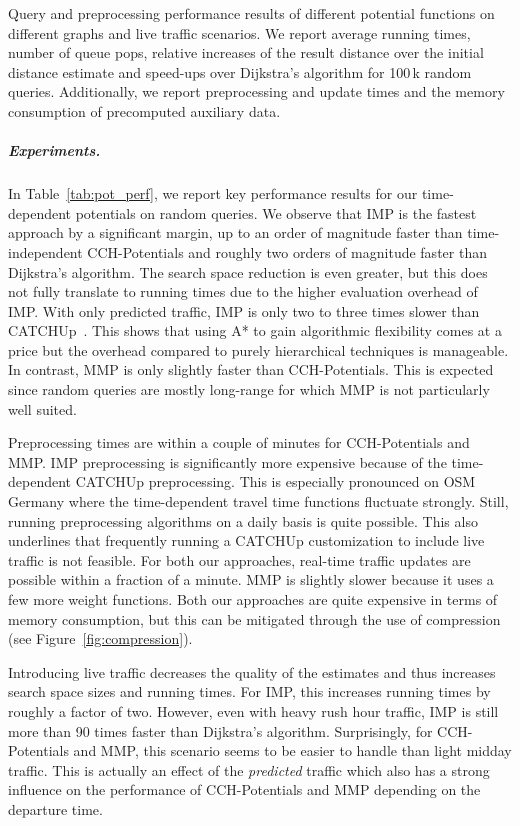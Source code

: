 \documentclass[a4paper,UKenglish,cleveref, autoref, thm-restate,anonymous]{lipics-v2021}
\begin{document}
\begin{table}
\centering
\caption{
Query and preprocessing performance results of different potential functions on different graphs and live traffic scenarios.
We report average running times, number of queue pops, relative increases of the result distance over the initial distance estimate and speed-ups over Dijkstra's algorithm for 100\,k random queries.
Additionally, we report preprocessing and update times and the memory consumption of precomputed auxiliary data.
}\label{tab:pot_perf}

\end{table}

\subparagraph{Experiments.} In Table~\ref{tab:pot_perf}, we report key performance results for our time-dependent potentials on random queries.
We observe that IMP is the fastest approach by a significant margin, up to an order of magnitude faster than time-independent CCH-Potentials and roughly two orders of magnitude faster than Dijkstra's algorithm.
The search space reduction is even greater, but this does not fully translate to running times due to the higher evaluation overhead of IMP.
With only predicted traffic, IMP is only two to three times slower than CATCHUp~\cite{swz-sfert-21}.
This shows that using A* to gain algorithmic flexibility comes at a price but the overhead compared to purely hierarchical techniques is manageable.
In contrast, MMP is only slightly faster than CCH-Potentials.
This is expected since random queries are mostly long-range for which MMP is not particularly well suited.

Preprocessing times are within a couple of minutes for CCH-Potentials and MMP.
IMP preprocessing is significantly more expensive because of the time-dependent CATCHUp preprocessing.
This is especially pronounced on OSM Germany where the time-dependent travel time functions fluctuate strongly.
Still, running preprocessing algorithms on a daily basis is quite possible.
This also underlines that frequently running a CATCHUp customization to include live traffic is not feasible.
For both our approaches, real-time traffic updates are possible within a fraction of a minute.
MMP is slightly slower because it uses a few more weight functions.
Both our approaches are quite expensive in terms of memory consumption, but this can be mitigated through the use of compression (see Figure~\ref{fig:compression}).

Introducing live traffic decreases the quality of the estimates and thus increases search space sizes and running times.
For IMP, this increases running times by roughly a factor of two.
However, even with heavy rush hour traffic, IMP is still more than 90 times faster than Dijkstra's algorithm.
Surprisingly, for CCH-Potentials and MMP, this scenario seems to be easier to handle than light midday traffic.
This is actually an effect of the \emph{predicted} traffic which also has a strong influence on the performance of CCH-Potentials and MMP depending on the departure time.
\end{document}
